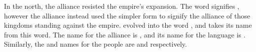 In the north, the alliance resisted the empire's expansion. The \langtvk{} word   signifies , however the alliance instead used the simpler form    to signify the alliance of those kingdoms standing against the empire.  evolved into the \langrdk{} word  , and \fw{\nlangrdk}   takes its name from this word. The \langank{} name for the alliance is  , and its name for the \langrdk{} language is  . Similarly, the \langrdk{} and \langank{} names for the \langrdk{} people are   and   respectively.